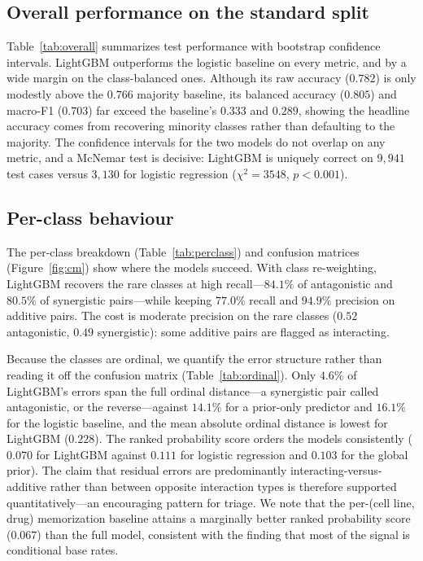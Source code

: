 \documentclass{bmcart}
\begin{document}
\subsection*{Overall performance on the standard split}
Table~\ref{tab:overall} summarizes test performance with bootstrap confidence intervals. LightGBM
outperforms the logistic baseline on every metric, and by a wide margin on the class-balanced ones.
Although its raw accuracy ($0.782$) is only modestly above the $0.766$ majority baseline, its balanced
accuracy ($0.805$) and macro-F1 ($0.703$) far exceed the baseline's $0.333$ and $0.289$, showing the
headline accuracy comes from recovering minority classes rather than defaulting to the majority. The
confidence intervals for the two models do not overlap on any metric, and a McNemar test is decisive:
LightGBM is uniquely correct on $9{,}941$ test cases versus $3{,}130$ for logistic regression
($\chi^2 = 3548$, $p<0.001$).

\subsection*{Per-class behaviour}
The per-class breakdown (Table~\ref{tab:perclass}) and confusion matrices (Figure~\ref{fig:cm}) show
where the models succeed. With class re-weighting, LightGBM recovers the rare classes at high
recall---$84.1\%$ of antagonistic and $80.5\%$ of synergistic pairs---while keeping $77.0\%$ recall and
$94.9\%$ precision on additive pairs. The cost is moderate precision on the rare classes
($0.52$ antagonistic, $0.49$ synergistic): some additive pairs are flagged as interacting.

Because the classes are ordinal, we quantify the error structure rather than reading it off the
confusion matrix (Table~\ref{tab:ordinal}). Only $4.6\%$ of LightGBM's errors span the full ordinal
distance---a synergistic pair called antagonistic, or the reverse---against $14.1\%$ for a prior-only
predictor and $16.1\%$ for the logistic baseline, and the mean absolute ordinal distance is lowest for
LightGBM ($0.228$). The ranked probability score orders the models consistently ($0.070$ for LightGBM
against $0.111$ for logistic regression and $0.103$ for the global prior). The claim that residual
errors are predominantly interacting-versus-additive rather than between opposite interaction types is
therefore supported quantitatively---an encouraging pattern for triage. We note that the
per-(cell line, drug) memorization baseline attains a marginally better ranked probability score
($0.067$) than the full model, consistent with the finding that most of the signal is conditional base
rates.
\end{document}
